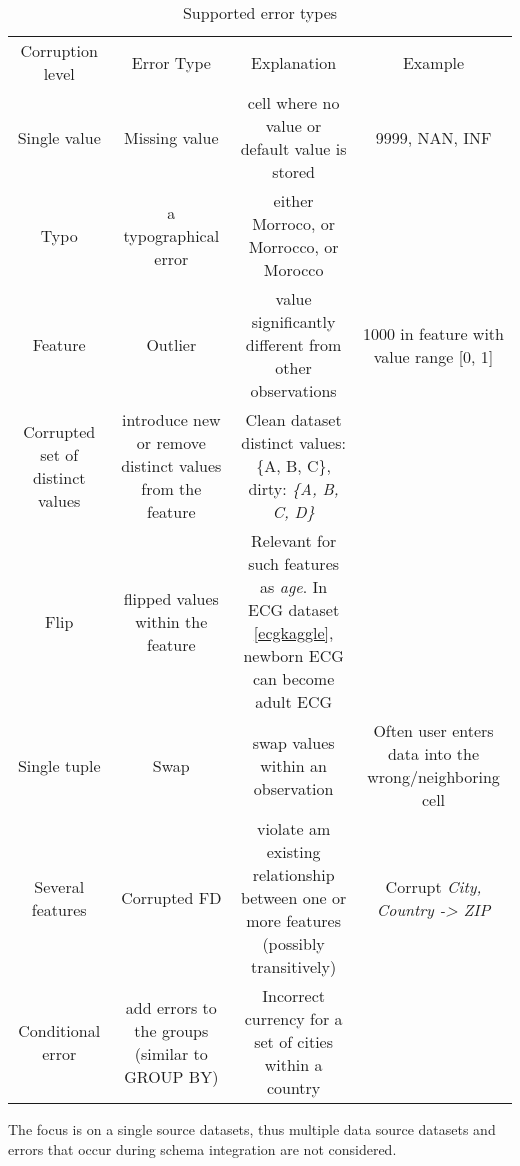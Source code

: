 \begin{table}
\centering
\begin{adjustbox}{width=1\textwidth}
    \begin{tabular}{ |c|c|c|c| }
      \hline
      Corruption level & Error Type & Explanation & Example\\

      Single value & Missing value & cell where no value or default value is stored & 9999, NAN, INF \\
      Typo & a typographical error & either Morroco, or Morrocco, or Morocco\\
      
      Feature & Outlier\cite{outlier_survey} & value significantly different from other observations & 1000 in feature with value range [0, 1] \\
      Corrupted set of distinct values & introduce new or remove distinct values from the feature & Clean dataset distinct values: {\{A, B, C\}}, dirty: \emph{\{A, B, C, D\}}\\
      Flip & flipped values within the feature & Relevant for such features as \emph{age}. In ECG dataset \ref{ecgkaggle}, newborn ECG can become adult ECG \\

    
      Single tuple & Swap & swap values within an observation & Often user enters data into the wrong/neighboring cell\\
      
      Several features & 
      Corrupted FD & violate am existing relationship between one or more features (possibly transitively) & Corrupt \emph{City, Country -> ZIP} \\
      Conditional error & add errors to the groups (similar to GROUP BY) & Incorrect currency for a set of cities within a country \\
      \hline
    \end{tabular}
\end{adjustbox}
\caption{\label{tab:errors} Supported error types}
\end{table}

The focus is on a single source datasets, thus multiple data source datasets and errors that occur during schema integration are not considered.

